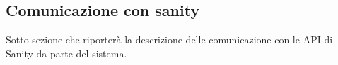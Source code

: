 \subsection{Comunicazione con sanity}

Sotto-sezione che riporterà la descrizione delle comunicazione con le API di Sanity da parte del sistema.